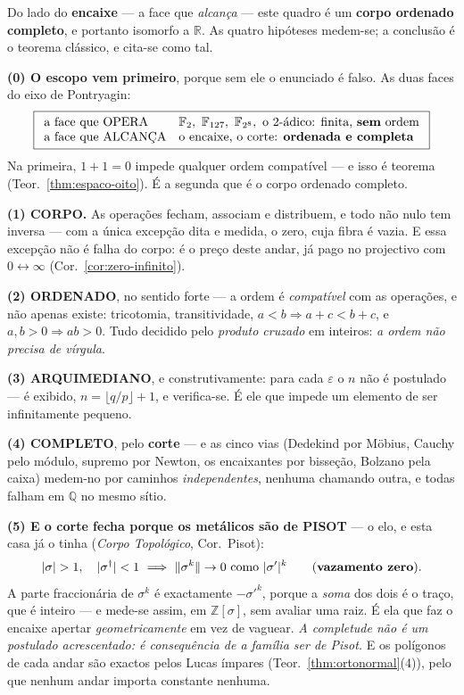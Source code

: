 \documentclass[livro.tex]{subfiles}
\begin{document}
\begin{teorema}\label{thm:ordenado-completo}
Do lado do \textbf{encaixe} --- a face que \emph{alcança} --- este quadro
é um \textbf{corpo ordenado completo}, e portanto isomorfo a $\mathbb{R}$.
As quatro hipóteses medem-se; a conclusão é o teorema clássico, e cita-se
como tal.

\textbf{(0) O escopo vem primeiro}, porque sem ele o enunciado é falso.
As duas faces do eixo de Pontryagin:
\[
\boxed{
\begin{array}{ll}
\text{a face que OPERA} & \mathbb{F}_2,\ \mathbb{F}_{127},\
\mathbb{F}_{2^8},\ \text{o }2\text{-ádico: finita, \textbf{sem} ordem}\\
\text{a face que ALCANÇA} & \text{o encaixe, o corte: \textbf{ordenada e
completa}}
\end{array}}
\]
Na primeira, $1+1=0$ impede qualquer ordem compatível --- e isso é
teorema (Teor.~\ref{thm:espaco-oito}). É a segunda que é o corpo
ordenado completo.

\textbf{(1) CORPO.} As operações fecham, associam e distribuem, e todo
não nulo tem inversa --- com a única excepção dita e medida, o zero, cuja
fibra é vazia. E essa excepção não é falha do corpo: é o preço deste
andar, já pago no projectivo com $0\leftrightarrow\infty$
(Cor.~\ref{cor:zero-infinito}).

\textbf{(2) ORDENADO}, no sentido forte --- a ordem é \emph{compatível}
com as operações, e não apenas existe: tricotomia, transitividade,
$a<b\Rightarrow a+c<b+c$, e $a,b>0\Rightarrow ab>0$. Tudo decidido pelo
\emph{produto cruzado} em inteiros: \emph{a ordem não precisa de vírgula}.

\textbf{(3) ARQUIMEDIANO}, e construtivamente: para cada $\varepsilon$ o
$n$ não é postulado --- é exibido, $n=\lfloor q/p\rfloor+1$, e
verifica-se. É ele que impede um elemento de ser infinitamente pequeno.

\textbf{(4) COMPLETO}, pelo \textbf{corte} --- e as cinco vias
(Dedekind por Möbius, Cauchy pelo módulo, supremo por Newton, os
encaixantes por bisseção, Bolzano pela caixa) medem-no por caminhos
\emph{independentes}, nenhuma chamando outra, e todas falham em
$\mathbb{Q}$ no mesmo sítio.

\textbf{(5) E o corte fecha porque os metálicos são de PISOT} --- o elo,
e esta casa já o tinha (\emph{Corpo Topológico}, Cor.~Pisot):
\[
|\sigma|>1,\quad|\sigma^{\dagger}|<1
\ \Longrightarrow\ \|\sigma^{k}\|\to0\ \text{como}\ |\sigma'|^{k}
\qquad\text{(\textbf{vazamento zero}).}
\]
A parte fraccionária de $\sigma^{k}$ é exactamente $-\sigma'^{k}$, porque
a \emph{soma} dos dois é o traço, que é inteiro --- e mede-se assim, em
$\mathbb{Z}[\sigma]$, sem avaliar uma raiz. É ela que faz o encaixe
apertar \emph{geometricamente} em vez de vaguear. \emph{A completude não
é um postulado acrescentado: é consequência de a família ser de Pisot.}
E os polígonos de cada andar são exactos pelos Lucas ímpares
(Teor.~\ref{thm:ortonormal}(4)), pelo que nenhum andar importa constante
nenhuma.


\end{teorema}
\end{document}
